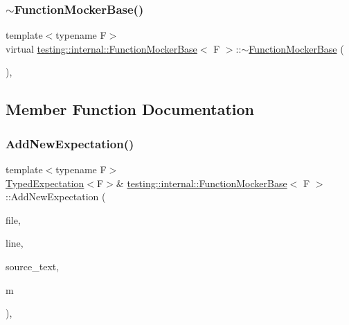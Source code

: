 \subsubsection{\texorpdfstring{$\sim$\+Function\+Mocker\+Base()}{~FunctionMockerBase()}}
{\footnotesize\ttfamily template$<$typename F$>$ \\
virtual \hyperlink{classtesting_1_1internal_1_1_function_mocker_base}{testing\+::internal\+::\+Function\+Mocker\+Base}$<$ F $>$\+::$\sim$\hyperlink{classtesting_1_1internal_1_1_function_mocker_base}{Function\+Mocker\+Base} (\begin{DoxyParamCaption}{ }\end{DoxyParamCaption})\hspace{0.3cm}{\ttfamily [inline]}, {\ttfamily [virtual]}}



\subsection{Member Function Documentation}
\mbox{\label{classtesting_1_1internal_1_1_function_mocker_base_aa2c35c565f08d3649436af443ece468f}} 
\subsubsection{\texorpdfstring{Add\+New\+Expectation()}{AddNewExpectation()}}
{\footnotesize\ttfamily template$<$typename F$>$ \\
\hyperlink{classtesting_1_1internal_1_1_typed_expectation}{Typed\+Expectation}$<$F$>$\& \hyperlink{classtesting_1_1internal_1_1_function_mocker_base}{testing\+::internal\+::\+Function\+Mocker\+Base}$<$ F $>$\+::Add\+New\+Expectation (\begin{DoxyParamCaption}\item[{const char $\ast$}]{file,  }\item[{int}]{line,  }\item[{const \hyperlink{namespacetesting_1_1internal_a8e8ff5b11e64078831112677156cb111}{string} \&}]{source\+\_\+text,  }\item[{const \hyperlink{classtesting_1_1internal_1_1_function_mocker_base_ab790bcb1dcf57fa6659365386723ae5a}{Argument\+Matcher\+Tuple} \&}]{m }\end{DoxyParamCaption})\hspace{0.3cm}{\ttfamily [inline]}, {\ttfamily [protected]}}

